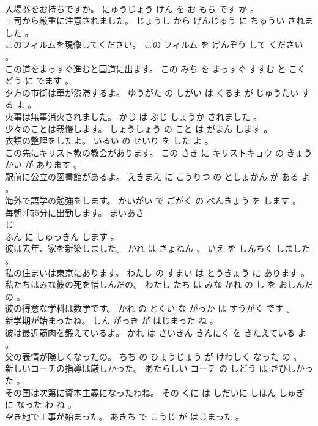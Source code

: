 \documentclass[8pt]{extreport}
\begin{document}
\begin{CJK}{UTF8}{min}
\\	入場券をお持ちですか。	にゅうじょう けん を お もち です か 。 
\\	上司から厳重に注意されました。	じょうし から げんじゅう に ちゅうい されました 。 
\\	このフィルムを現像してください。	この フィルム を げんぞう して ください 。 
\\	この道をまっすぐ進むと国道に出ます。	この みち を まっすぐ すすむ と こくどう に でます 。 
\\	夕方の市街は車が渋滞するよ。	ゆうがた の しがい は くるま が じゅうたい する よ 。 
\\	火事は無事消火されました。	かじ は ぶじ しょうか されました 。 
\\	少々のことは我慢します。	しょうしょう の こと は がまん します 。 
\\	衣類の整理をしたよ。	いるい の せいり を した よ 。 
\\	この先にキリスト教の教会があります。	この さき に キリストキョウ の きょうかい が あります 。 
\\	駅前に公立の図書館があるよ。	えきまえ に こうりつ の としょかん が ある よ 。 
\\	海外で語学の勉強をします。	かいがい で ごがく の べんきょう を します 。 
\\	毎朝7時5分に出勤します。	まいあさ 
\\	じ 
\\	ふん に しゅっきん します 。 
\\	彼は去年、家を新築しました。	かれ は きょねん 、 いえ を しんちく しました 。 
\\	私の住まいは東京にあります。	わたし の すまい は とうきょう に あります 。 
\\	私たちはみな彼の死を惜しんだの。	わたし たち は みな かれ の し を おしんだ の 。 
\\	彼の得意な学科は数学です。	かれ の とくい な がっか は すうがく です 。 
\\	新学期が始まったね。	しん がっき が はじまった ね 。 
\\	彼は最近筋肉を鍛えているよ。	かれ は さいきん きんにく を きたえている よ 。 
\\	父の表情が険しくなったの。	ちち の ひょうじょう が けわしく なった の 。 
\\	新しいコーチの指導は厳しかった。	あたらしい コーチ の しどう は きびしかった 。 
\\	その国は次第に資本主義になったわね。	その くに は しだいに しほん しゅぎ に なった わ ね 。 
\\	空き地で工事が始まった。	あきち で こうじ が はじまった 。 

\end{CJK}
\end{document}
